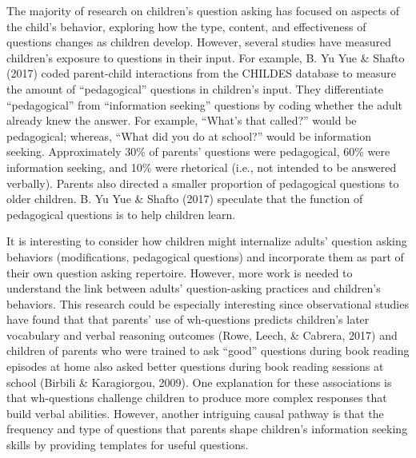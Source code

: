 \documentclass[oneside]{report}
\begin{document}
The majority of research on children's question asking has focused on
aspects of the child's behavior, exploring how the type, content, and
effectiveness of questions changes as children develop. However, several
studies have measured children's exposure to questions in their input.
For example, B. Yu Yue \& Shafto (2017) coded parent-child interactions
from the CHILDES database to measure the amount of ``pedagogical''
questions in children's input. They differentiate ``pedagogical'' from
``information seeking'' questions by coding whether the adult already
knew the answer. For example, ``What's that called?'' would be
pedagogical; whereas, ``What did you do at school?'' would be
information seeking. Approximately 30\% of parents' questions were
pedagogical, 60\% were information seeking, and 10\% were rhetorical
(i.e., not intended to be answered verbally). Parents also directed a
smaller proportion of pedagogical questions to older children. B. Yu Yue
\& Shafto (2017) speculate that the function of pedagogical questions is
to help children learn.

It is interesting to consider how children might internalize adults'
question asking behaviors (modifications, pedagogical questions) and
incorporate them as part of their own question asking repertoire.
However, more work is needed to understand the link between adults'
question-asking practices and children's behaviors. This research could
be especially interesting since observational studies have found that
that parents' use of wh-questions predicts children's later vocabulary
and verbal reasoning outcomes (Rowe, Leech, \& Cabrera, 2017) and
children of parents who were trained to ask ``good'' questions during
book reading episodes at home also asked better questions during book
reading sessions at school (Birbili \& Karagiorgou, 2009). One
explanation for these associations is that wh-questions challenge
children to produce more complex responses that build verbal abilities.
However, another intriguing causal pathway is that the frequency and
type of questions that parents shape children's information seeking
skills by providing templates for useful questions.
\end{document}
